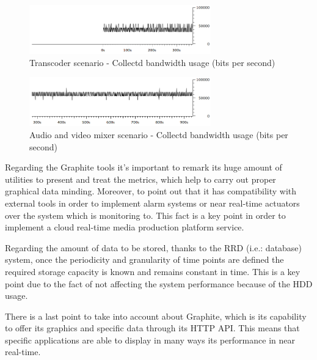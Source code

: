 \begin{figure}[!htb]
\begin{center}
\includegraphics[width=0.70\textwidth]{./images/testStats/testStatsDocker/collectdBWbits.png}
\caption{Transcoder scenario - Collectd bandwidth usage (bits per second)}
\label{F:tscbu}
\end{center}
\end{figure}

\begin{figure}[!htb]
\begin{center}
\includegraphics[width=0.70\textwidth]{./images/testAVMix/collectdBWbits.png}
\caption{Audio and video mixer scenario - Collectd bandwidth usage (bits per second)}
\label{F:avmscbu}
\end{center}
\end{figure}

Regarding the Graphite tools it's important to remark its huge amount of utilities to present and treat the metrics, which help to carry out proper graphical data minding. Moreover, to point out that it has compatibility with external tools in order to implement alarm systems or near real-time actuators over the system which is monitoring to. This fact is a key point in order to implement a cloud real-time media production platform service. 

Regarding the amount of data to be stored, thanks to the RRD (i.e.: database) system, once the periodicity and granularity of time points are defined the required storage capacity is known and remains constant in time. This is a key point due to the fact of not affecting the system performance because of the HDD usage.

There is a last point to take into account about Graphite, which is its capability to offer its graphics and specific data through its HTTP API. This means that specific applications are able to display in many ways its performance in near real-time.

